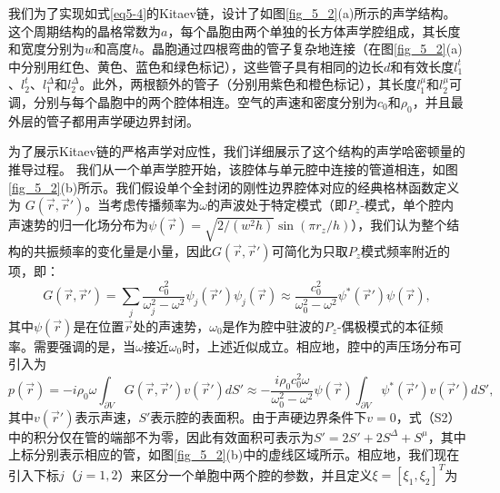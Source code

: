 我们为了实现如式\ref{eq5-4}的Kitaev链，设计了如图\ref{fig_5_2}(a)所示的声学结构。这个周期结构的晶格常数为\(a\)，每个晶胞由两个单独的长方体声学腔组成，其长度和宽度分别为\(w\)和高度\(h\)。晶胞通过四根弯曲的管子复杂地连接（在图\ref{fig_5_2}(a)中分别用红色、黄色、蓝色和绿色标记），这些管子具有相同的边长\(d\)和有效长度\(l_{1}^{t}\)、\(l_{2}^{t}\)、\(l_{1}^{\Delta}\)和\(l_{2}^{\Delta}\)。此外，两根额外的管子（分别用紫色和橙色标记），其长度\(l_{1}^{\mu}\)和\(l_{2}^{\mu}\)可调，分别与每个晶胞中的两个腔体相连。空气的声速和密度分别为\(c_{0}\)和\(\rho_{0}\)，并且最外层的管子都用声学硬边界封闭。

为了展示Kitaev链的严格声学对应性，我们详细展示了这个结构的声学哈密顿量的推导过程。
我们从一个单声学腔开始，该腔体与单元腔中连接的管道相连，如图\ref{fig_5_2}(b)所示。我们假设单个全封闭的刚性边界腔体对应的经典格林函数定义为 \( G(\vec{r}, \vec{r}') \)。当考虑传播频率为$\omega$的声波处于特定模式（即$P_z$-模式，单个腔内声速势的归一化场分布为$\psi(\vec{r}) = \sqrt{2/(w^2h)}\sin(\pi r_z/h)$），我们认为整个结构的共振频率的变化量是小量，因此$G(\vec{r},\vec{r}')$可简化为只取$P_z$模式频率附近的项，即：
\begin{equation}\label{eq5-5}
    G(\vec{r},\vec{r}') = \sum_{j} \frac{c_0^2}{\omega_j^2 - \omega^2} \psi_j(\vec{r}')\psi_j(\vec{r}) \approx \frac{c_0^2}{\omega_0^2 - \omega^2} \psi^*(\vec{r}')\psi(\vec{r}),
\end{equation}
其中$\psi(\vec{r})$是在位置$\vec{r}$处的声速势，$\omega_0$是作为腔中驻波的$P_z$-偶极模式的本征频率。需要强调的是，当$\omega$接近$\omega_0$时，上述近似成立。相应地，腔中的声压场分布可引入为
\begin{equation}\label{eq5-6}
    p(\vec{r}) = -i\rho_0\omega \int_{\partial V} G(\vec{r},\vec{r}')v(\vec{r}')dS' \approx -\frac{i\rho_0c_0^2\omega}{\omega_0^2 - \omega^2} \psi(\vec{r}) \int_{\partial V} \psi^*(\vec{r}')v(\vec{r}')dS',
\end{equation}
其中$v(\vec{r}')$表示声速，$S'$表示腔的表面积。由于声硬边界条件下$v = 0$，式（S2）中的积分仅在管的端部不为零，因此有效面积可表示为$S' = 2S' + 2S^{\Delta} + S^{\mu}$，其中上标分别表示相应的管，如图\ref{fig_5_2}(b)中的虚线区域所示。相应地，我们现在引入下标$j$（$j = 1,2$）来区分一个单胞中两个腔的参数，并且定义$\xi = [\xi_1,\xi_2]^T$为
